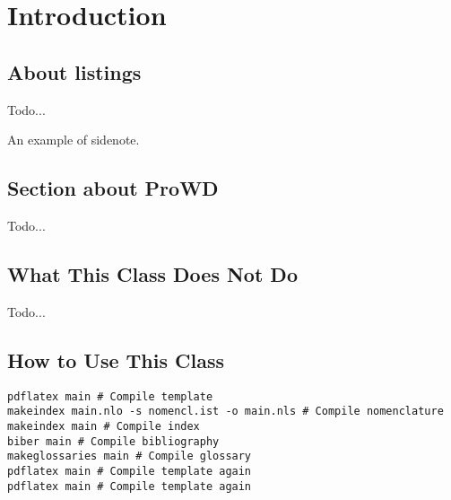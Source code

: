 \setchapterpreamble[u]{\margintoc}
\chapter{Introduction}

\section{About listings}

Todo...

An example of sidenote.


\section{Section about ProWD}

Todo...



\section{What This Class Does Not Do}

Todo...



\section{How to Use This Class}

\begin{lstlisting}[style=kaolstplain,linewidth=1.5\textwidth]
pdflatex main # Compile template
makeindex main.nlo -s nomencl.ist -o main.nls # Compile nomenclature
makeindex main # Compile index
biber main # Compile bibliography
makeglossaries main # Compile glossary
pdflatex main # Compile template again
pdflatex main # Compile template again
\end{lstlisting}


